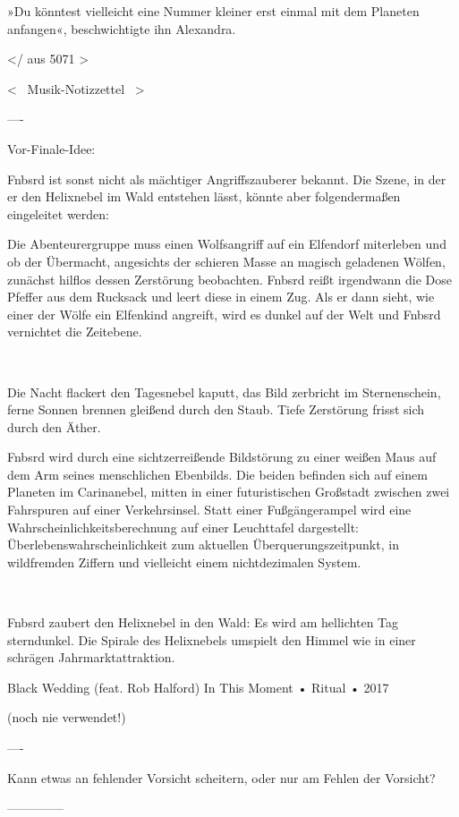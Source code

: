 »Du könntest vielleicht eine Nummer kleiner erst einmal mit dem Planeten anfangen«, beschwichtigte ihn Alexandra.

</ aus 5071 >




<~ Musik-Notizzettel ~>

----

Vor-Finale-Idee:

Fnbsrd ist sonst nicht als mächtiger Angriffszauberer bekannt. Die Szene, in der er den Helixnebel im Wald entstehen lässt, könnte aber folgendermaßen eingeleitet werden:

Die Abenteurergruppe muss einen Wolfsangriff auf ein Elfendorf miterleben und ob der Übermacht, angesichts der schieren Masse an magisch geladenen Wölfen, zunächst hilflos dessen Zerstörung beobachten. Fnbsrd reißt irgendwann die Dose Pfeffer aus dem Rucksack und leert diese in einem Zug. Als er dann sieht, wie einer der Wölfe ein Elfenkind angreift, wird es dunkel auf der Welt und Fnbsrd vernichtet die Zeitebene.

~ ~ ~

Die Nacht flackert den Tagesnebel kaputt, das Bild zerbricht im Sternenschein, ferne Sonnen brennen gleißend durch den Staub. Tiefe Zerstörung frisst sich durch den Äther.

Fnbsrd wird durch eine sichtzerreißende Bildstörung zu einer weißen Maus auf dem Arm seines menschlichen Ebenbilds. Die beiden befinden sich auf einem Planeten im Carinanebel, mitten in einer futuristischen Großstadt zwischen zwei Fahrspuren auf einer Verkehrsinsel. Statt einer Fußgängerampel wird eine Wahrscheinlichkeitsberechnung auf einer Leuchttafel dargestellt: Überlebenswahrscheinlichkeit zum aktuellen Überquerungszeitpunkt, in wildfremden Ziffern und vielleicht einem nichtdezimalen System.

~ ~ ~

Fnbsrd zaubert den Helixnebel in den Wald:
Es wird am hellichten Tag sterndunkel. Die Spirale des Helixnebels umspielt den Himmel wie in einer schrägen Jahrmarktattraktion.

Black Wedding (feat. Rob Halford)
In This Moment
 •
Ritual
 • 2017

(noch nie verwendet!)

----



Kann etwas an fehlender Vorsicht scheitern, oder nur am Fehlen der Vorsicht?




--------------

